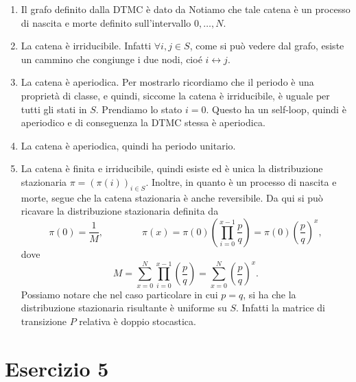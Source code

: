 \documentclass[
	12pt, %
]{fphw}
\begin{document}
\begin{enumerate}
	\item Il grafo definito dalla DTMC è dato da
		Notiamo che tale catena è un processo di nascita e morte definito sull'intervallo $0, \dots, N$.
	\item La catena è irriducibile. Infatti $\forall i,j \in S$, come si può vedere dal grafo, esiste un cammino che congiunge i due nodi, cioé $i \leftrightarrow j$.
	\item La catena è aperiodica. Per mostrarlo ricordiamo che il periodo è una proprietà di classe, e quindi, siccome la catena è irriducibile, è uguale per tutti gli stati in $S$.
		Prendiamo lo stato $i = 0$. Questo ha un self-loop, quindi è aperiodico e di conseguenza la DTMC stessa è aperiodica.
	\item La catena è aperiodica, quindi ha periodo unitario.
	\item La catena è finita e irriducibile, quindi esiste ed è unica la distribuzione stazionaria $\pi = (\pi(i))_{i \in S}$.
		Inoltre, in quanto è un processo di nascita e morte, segue che la catena stazionaria è anche reversibile.
		Da qui si può ricavare la distribuzione stazionaria definita da
		\begin{equation*}
			\pi(0) = \frac{1}{M},	\qquad\qquad	\pi(x) = \pi(0) \left( \prod_{i=0}^{x-1} \frac{p}{q} \right) = \pi(0) \left(\frac{p}{q}\right)^x,
		\end{equation*}
		dove
		\begin{equation*}
			M = \sum_{x=0}^N \prod_{i=0}^{x-1} \left( \frac{p}{q} \right) = \sum_{x=0}^N \left(\frac{p}{q}\right)^x.
		\end{equation*}
		Possiamo notare che nel caso particolare in cui $p = q$, si ha che la distribuzione stazionaria risultante è uniforme su $S$.
		Infatti la matrice di transizione $P$ relativa è doppio stocastica.
	
\end{enumerate}

\newpage
\section*{Esercizio 5}
\end{document}
